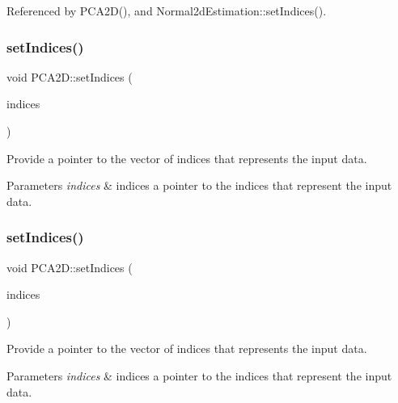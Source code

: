 Referenced by P\+C\+A2\+D(), and Normal2d\+Estimation\+::set\+Indices().

\mbox{\label{classPCA2D_a0b214db07c98537f683bb69a7e9d9271}} 
\subsubsection{\texorpdfstring{set\+Indices()}{setIndices()}\hspace{0.1cm}{\footnotesize\ttfamily [2/10]}}
{\footnotesize\ttfamily void P\+C\+A2\+D\+::set\+Indices (\begin{DoxyParamCaption}\item[{const pcl\+::\+Point\+Indices\+Ptr \&}]{indices }\end{DoxyParamCaption})}



Provide a pointer to the vector of indices that represents the input data. 


\begin{DoxyParams}{Parameters}
{\em indices} & indices a pointer to the indices that represent the input data. \\
\hline
\end{DoxyParams}
\mbox{\label{classPCA2D_a51c7a6bcf7c77af6d81d98a0bb0186a6}} 
\subsubsection{\texorpdfstring{set\+Indices()}{setIndices()}\hspace{0.1cm}{\footnotesize\ttfamily [3/10]}}
{\footnotesize\ttfamily void P\+C\+A2\+D\+::set\+Indices (\begin{DoxyParamCaption}\item[{const pcl\+::\+Point\+Indices\+Const\+Ptr \&}]{indices }\end{DoxyParamCaption})}



Provide a pointer to the vector of indices that represents the input data. 


\begin{DoxyParams}{Parameters}
{\em indices} & indices a pointer to the indices that represent the input data. \\
\hline
\end{DoxyParams}
\mbox{\label{classPCA2D_a4e7f046e1198928994dfc40a4c3be40e}} 
